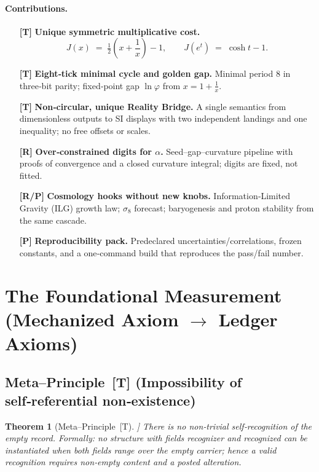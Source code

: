 \documentclass[11pt]{article}
\begin{document}
\paragraph{Contributions.}
\begin{itemize}
  \item[\textbf{[T]}] \textbf{Unique symmetric multiplicative cost.} 
  \[
    J(x)\;=\;\tfrac12\!\left(x+\frac{1}{x}\right)-1,
    \qquad
    J(e^{t})\;=\;\cosh t - 1.
  \]
  \item[\textbf{[T]}] \textbf{Eight‑tick minimal cycle and golden gap.}
  Minimal period \(8\) in three‑bit parity; fixed‑point gap \(\ln\varphi\) from \(x=1+\tfrac{1}{x}\).
  \item[\textbf{[T]}] \textbf{Non‑circular, unique Reality Bridge.}
  A single semantics from dimensionless outputs to SI displays with two independent landings and one inequality; no free offsets or scales.
  \item[\textbf{[R]}] \textbf{Over‑constrained digits for \(\alpha\).}
  Seed–gap–curvature pipeline with proofs of convergence and a closed curvature integral; digits are fixed, not fitted.
  \item[\textbf{[R/P]}] \textbf{Cosmology hooks without new knobs.}
  Information‑Limited Gravity (ILG) growth law; \(\sigma_{8}\) forecast; baryogenesis and proton stability from the same cascade.
  \item[\textbf{[P]}] \textbf{Reproducibility pack.}
  Predeclared uncertainties/correlations, frozen constants, and a one‑command build that reproduces the pass/fail number.
\end{itemize}


\newcommand{\ph}{\varphi}
\newcommand{\Jbit}{J_{\text{bit}}}
\newtheorem{theorem}{Theorem}
\newtheorem{lemma}{Lemma}
\newtheorem{corollary}{Corollary}

\section{The Foundational Measurement (Mechanized Axiom $\to$ Ledger Axioms)}

\subsection{Meta–Principle \,[T] (Impossibility of self‑referential non‑existence)}
\begin{theorem}[Meta–Principle \,[T]]
There is no non‑trivial self‑recognition of the empty record. Formally: no structure with fields \emph{recognizer} and \emph{recognized} can be instantiated when both fields range over the empty carrier; hence a valid recognition requires non‑empty content and a posted alteration.
\end{theorem}
\end{document}
